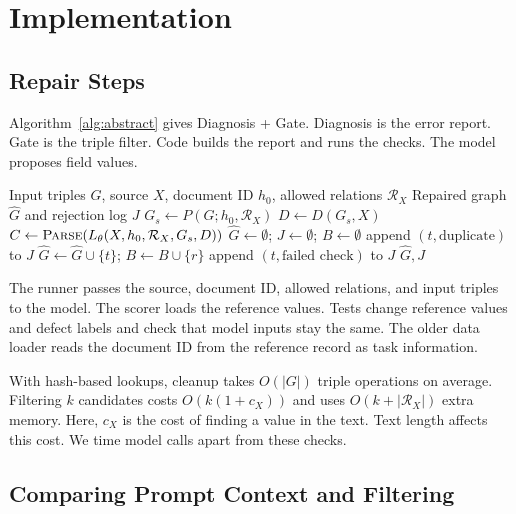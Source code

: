 \section{Implementation}
\label{sec:implementation}

\subsection{Repair Steps}
\label{sec:impl:assessment}

Algorithm~\ref{alg:abstract} gives Diagnosis + Gate.
Diagnosis is the error report. Gate is the triple filter.
Code builds the report and runs the checks. The model proposes field values.

\begin{algorithm}[t]
\caption{Repair with source text and field checks}
\label{alg:abstract}
\begin{algorithmic}[1]
\Require Input triples $G$, source $X$, document ID $h_0$, allowed relations $\mathcal R_X$
\Ensure Repaired graph $\widehat G$ and rejection log $J$
\State $G_s\gets P(G;h_0,\mathcal R_X)$
\State $D\gets D(G_s,X)$
\State $C\gets\textsc{Parse}(L_\theta(X,h_0,\mathcal R_X,G_s,D))$
\State $\widehat G\gets\emptyset$; $J\gets\emptyset$; $B\gets\emptyset$
        \State append $(t,\text{duplicate})$ to $J$
        \State $\widehat G\gets\widehat G\cup\{t\}$; $B\gets B\cup\{r\}$
    \Else
        \State append $(t,\text{failed check})$ to $J$
    \EndIf
\EndFor
\State \Return $\widehat G,J$
\end{algorithmic}
\end{algorithm}

The runner passes the source, document ID, allowed relations, and input
triples to the model. The scorer loads the reference values.
Tests change reference values and defect labels and check that model inputs
stay the same. The older data loader reads the document ID from the
reference record as task information.

With hash-based lookups, cleanup takes $O(|G|)$ triple operations on average.
Filtering $k$ candidates costs $O(k(1+c_X))$ and uses
$O(k+|\mathcal R_X|)$ extra memory. Here, $c_X$ is the cost of finding a
value in the text. Text length affects this cost. We time model calls
apart from these checks.

\subsection{Comparing Prompt Context and Filtering}
\label{sec:impl:enhancement}

